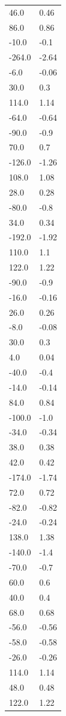 \begin{longtable}{ll}
46.0 & 0.46 \\
86.0 & 0.86 \\
-10.0 & -0.1 \\
-264.0 & -2.64 \\
-6.0 & -0.06 \\
30.0 & 0.3 \\
114.0 & 1.14 \\
-64.0 & -0.64 \\
-90.0 & -0.9 \\
70.0 & 0.7 \\
-126.0 & -1.26 \\
108.0 & 1.08 \\
28.0 & 0.28 \\
-80.0 & -0.8 \\
34.0 & 0.34 \\
-192.0 & -1.92 \\
110.0 & 1.1 \\
122.0 & 1.22 \\
-90.0 & -0.9 \\
-16.0 & -0.16 \\
26.0 & 0.26 \\
-8.0 & -0.08 \\
30.0 & 0.3 \\
4.0 & 0.04 \\
-40.0 & -0.4 \\
-14.0 & -0.14 \\
84.0 & 0.84 \\
-100.0 & -1.0 \\
-34.0 & -0.34 \\
38.0 & 0.38 \\
42.0 & 0.42 \\
-174.0 & -1.74 \\
72.0 & 0.72 \\
-82.0 & -0.82 \\
-24.0 & -0.24 \\
138.0 & 1.38 \\
-140.0 & -1.4 \\
-70.0 & -0.7 \\
60.0 & 0.6 \\
40.0 & 0.4 \\
68.0 & 0.68 \\
-56.0 & -0.56 \\
-58.0 & -0.58 \\
-26.0 & -0.26 \\
114.0 & 1.14 \\
48.0 & 0.48 \\
122.0 & 1.22 \\

\end{longtable}
